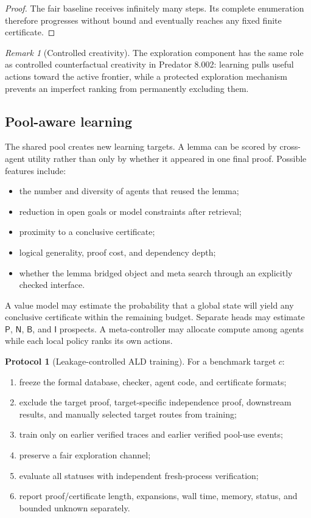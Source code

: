 \documentclass[11pt]{article}
\theoremstyle{definition}
\newtheorem{protocol}[theorem]{Protocol}
\theoremstyle{remark}
\newtheorem{remark}[theorem]{Remark}
\newcommand{\Plus}{\mathsf{P}}
\newcommand{\Minus}{\mathsf{N}}
\newcommand{\BotEv}{\mathsf{B}}
\newcommand{\IndEv}{\mathsf{I}}
\begin{document}
\begin{proof}
The fair baseline receives infinitely many steps. Its complete enumeration therefore progresses without bound and eventually reaches any fixed finite certificate.
\end{proof}

\begin{remark}[Controlled creativity]
The exploration component has the same role as controlled counterfactual creativity in Predator 8.002: learning pulls useful actions toward the active frontier, while a protected exploration mechanism prevents an imperfect ranking from permanently excluding them.
\end{remark}

\subsection{Pool-aware learning}
The shared pool creates new learning targets. A lemma can be scored by cross-agent utility rather than only by whether it appeared in one final proof. Possible features include:
\begin{itemize}
  \item the number and diversity of agents that reused the lemma;
  \item reduction in open goals or model constraints after retrieval;
  \item proximity to a conclusive certificate;
  \item logical generality, proof cost, and dependency depth;
  \item whether the lemma bridged object and meta search through an explicitly checked interface.
\end{itemize}

A value model may estimate the probability that a global state will yield any conclusive certificate within the remaining budget. Separate heads may estimate $\Plus$, $\Minus$, $\BotEv$, and $\IndEv$ prospects. A meta-controller may allocate compute among agents while each local policy ranks its own actions.

\begin{protocol}[Leakage-controlled ALD training]
For a benchmark target $c$:
\begin{enumerate}[label=(\roman*)]
  \item freeze the formal database, checker, agent code, and certificate formats;
  \item exclude the target proof, target-specific independence proof, downstream results, and manually selected target routes from training;
  \item train only on earlier verified traces and earlier verified pool-use events;
  \item preserve a fair exploration channel;
  \item evaluate all statuses with independent fresh-process verification;
  \item report proof/certificate length, expansions, wall time, memory, status, and bounded unknown separately.
\end{enumerate}
\end{protocol}
\end{document}
